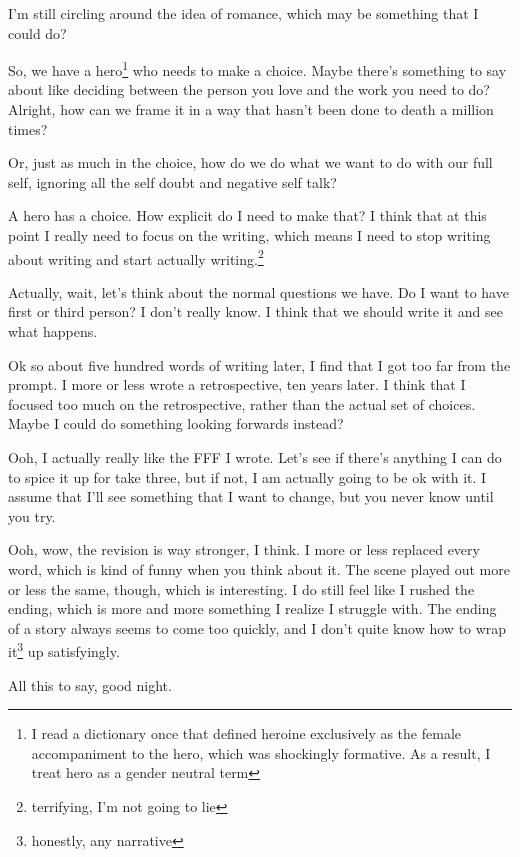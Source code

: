 \documentclass[12pt]{article}[titlepage]
\newcommand{\1}{\={a}}
\newcommand{\2}{\={e}}
\newcommand{\3}{\={\i}}
\newcommand{\4}{\=o}
\newcommand{\5}{\=u}
\newcommand{\6}{\={A}}
\renewcommand{\,}{\textsuperscript{,}}
\begin{document}
I'm still circling around the idea of romance, which may be something that I could do?

So, we have a hero\footnote{I read a dictionary once that defined heroine exclusively as the female accompaniment to the hero, which was shockingly formative. As a result, I treat hero as a gender neutral term} who needs to make a choice.
Maybe there's something to say about like deciding between the person you love and the work you need to do?
Alright, how can we frame it in a way that hasn't been done to death a million times?

Or, just as much in the choice, how do we do what we want to do with our full self, ignoring all the self doubt and negative self talk?

A hero has a choice.
How explicit do I need to make that?
I think that at this point I really need to focus on the writing, which means I need to stop writing about writing and start actually writing.\footnote{terrifying, I'm not going to lie}

Actually, wait, let's think about the normal questions we have.
Do I want to have first or third person?
I don't really know.
I think that we should write it and see what happens.

Ok so about five hundred words of writing later, I find that I got too far from the prompt.
I more or less wrote a retrospective, ten years later.
I think that I focused too much on the retrospective, rather than the actual set of choices.
Maybe I could do something looking forwards instead?

Ooh, I actually really like the FFF I wrote. Let's see if there's anything I can do to spice it up for take three, but if not, I am actually going to be ok with it.
I assume that I'll see something that I want to change, but you never know until you try.

Ooh, wow, the revision is way stronger, I think. I more or less replaced every word, which is kind of funny when you think about it. The scene played out more or less the same, though, which is interesting.
I do still feel like I rushed the ending, which is more and more something I realize I struggle with.
The ending of a story always seems to come too quickly, and I don't quite know how to wrap it\footnote{honestly, any narrative} up satisfyingly.

All this to say, good night.
\end{document}
